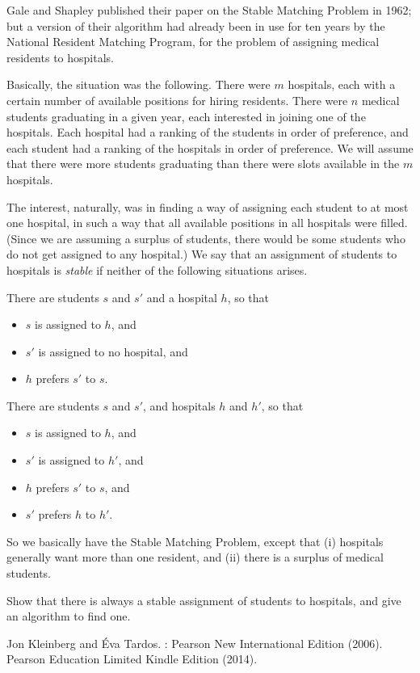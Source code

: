 \documentclass[11pt,letterpaper]{article}
\begin{document}
Gale and Shapley published their paper on the Stable Matching Problem  in 1962; but a version of their algorithm had already been in use for ten years by the National Resident Matching Program, for the problem of assigning medical residents to hospitals.

Basically, the situation was the following. There were $m$ hospitals,  each with a certain number of available positions for hiring residents. There were $n$ medical students graduating in a given year, each interested in joining one of the hospitals. Each hospital had a ranking of the students  in order of preference, and each student had a ranking of the hospitals  in order of preference. We will assume that there were more students  graduating than there were slots available in the $m$ hospitals.

The interest, naturally, was in finding a way of assigning each student  to at most one hospital, in such a way that all available positions in all  hospitals were filled. (Since we are assuming a surplus of students, there  would be some students who do not get assigned to any hospital.)  We say that an assignment of students to hospitals is {\em stable} if neither  of the following situations arises.

\medskip
{} There are students $s$ and $s'$ and a hospital $h$, so that

\begin{itemize}
	\item $s$ is assigned to $h$, and  
	\item $s'$ is assigned to no hospital, and 
	\item $h$ prefers $s'$ to $s$.
\end{itemize}

\medskip
{} There are students $s$ and $s'$, and hospitals $h$ and $h'$, so that 

\begin{itemize}
	\item $s$ is assigned to $h$, and
	\item $s'$ is assigned to $h'$, and 
	\item $h$ prefers $s'$ to $s$, and
	\item $s'$ prefers $h$ to $h'$. 
\end{itemize}

So we basically have the Stable Matching Problem, except that (i)  hospitals generally want more than one resident, and (ii) there is a surplus  of medical students.

Show that there is always a stable assignment of students to hospitals, and give an algorithm to find one. 

\begin{thebibliography}{11}

	Jon Kleinberg and Éva Tardos.
	: Pearson New International Edition (2006).
	\newblock Pearson Education Limited Kindle Edition (2014). 
	
\end{thebibliography}
\end{document}
